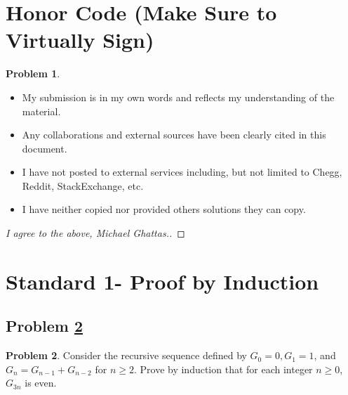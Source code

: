 \documentclass[11pt]{article}
\theoremstyle{definition}
\theoremstyle{definition}
\newtheorem{required}{Problem}
\theoremstyle{definition}
\begin{document}
\section{Honor Code (Make Sure to Virtually Sign)} \label{HonorCode}

\begin{required}
\begin{itemize}
\item My submission is in my own words and reflects my understanding of the material.
\item Any collaborations and external sources have been clearly cited in this document.
\item I have not posted to external services including, but not limited to Chegg, Reddit, StackExchange, etc.
\item I have neither copied nor provided others solutions they can copy.
\end{itemize}

\end{required}

\begin{proof}[I agree to the above, Michael Ghattas.]
\end{proof}


\newpage
\section{Standard 1- Proof by Induction}

\subsection{Problem \ref{Induction1}}
\begin{required} \label{Induction1}
Consider the recursive sequence defined by $G_{0} = 0, G_{1} = 1$, and $G_{n} = G_{n-1} + G_{n-2}$ for $n \geq 2$. Prove by induction that for each integer $n \geq 0$, $G_{3n}$ is even.\end{required}


\end{document}
